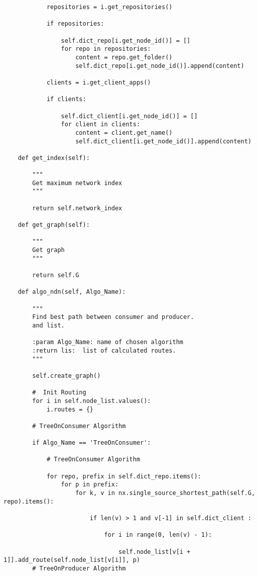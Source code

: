 \begin{lstlisting}
            repositories = i.get_repositories()

            if repositories:

                self.dict_repo[i.get_node_id()] = []
                for repo in repositories:
                    content = repo.get_folder()
                    self.dict_repo[i.get_node_id()].append(content)

            clients = i.get_client_apps()

            if clients:

                self.dict_client[i.get_node_id()] = []
                for client in clients:
                    content = client.get_name()
                    self.dict_client[i.get_node_id()].append(content)

    def get_index(self):

        """
        Get maximum network index
        """

        return self.network_index

    def get_graph(self):

        """
        Get graph
        """

        return self.G

    def algo_ndn(self, Algo_Name):

        """
        Find best path between consumer and producer. 
        and list.

        :param Algo_Name: name of chosen algorithm
        :return lis:  list of calculated routes.
        """

        self.create_graph()

        #  Init Routing
        for i in self.node_list.values():
            i.routes = {}

        # TreeOnConsumer Algorithm

        if Algo_Name == 'TreeOnConsumer':

            # TreeOnConsumer Algorithm

            for repo, prefix in self.dict_repo.items():
                for p in prefix:
                    for k, v in nx.single_source_shortest_path(self.G, repo).items():

                        if len(v) > 1 and v[-1] in self.dict_client :

                            for i in range(0, len(v) - 1):

                                self.node_list[v[i + 1]].add_route(self.node_list[v[i]], p)
        # TreeOnProducer Algorithm


\end{lstlisting}
